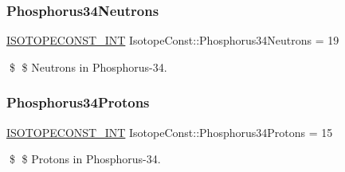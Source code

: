 \subsubsection{\texorpdfstring{Phosphorus34\+Neutrons}{Phosphorus34Neutrons}}
{\footnotesize\ttfamily \mbox{\hyperlink{group___isotope_const-_macros_ga5f18360b3e99483a35c32d789e62621c}{I\+S\+O\+T\+O\+P\+E\+C\+O\+N\+S\+T\+\_\+\+I\+NT}} Isotope\+Const\+::\+Phosphorus34\+Neutrons = 19}

\$ \$ Neutrons in Phosphorus-\/34. \mbox{\label{group___isotope_const-_phosphorus-_p34_gafea1149d1a1045a42b16065cc555afb2}} 
\subsubsection{\texorpdfstring{Phosphorus34\+Protons}{Phosphorus34Protons}}
{\footnotesize\ttfamily \mbox{\hyperlink{group___isotope_const-_macros_ga5f18360b3e99483a35c32d789e62621c}{I\+S\+O\+T\+O\+P\+E\+C\+O\+N\+S\+T\+\_\+\+I\+NT}} Isotope\+Const\+::\+Phosphorus34\+Protons = 15}

\$ \$ Protons in Phosphorus-\/34. 